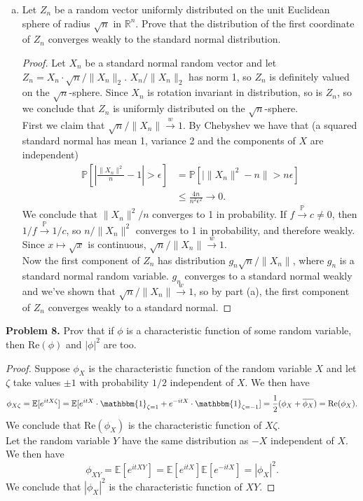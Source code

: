 \documentclass[11pt,letterpaper]{report}
\newcommand{\reals}{\mathbb{R}}
\newcommand{\E}{\mathbb{E}}
\newcommand{\Prob}{\mathbb{P}}
\newcommand{\ind}{\mathbbm{1}}
\newcommand{\inprob}{\xrightarrow{\Prob}}
\newcommand{\weakly}{\xrightarrow{w}}
\renewcommand{\Re}{\text{Re}}
\begin{document}
\begin{enumerate}[(a)]
	\item Let $Z_n$ be a random vector uniformly distributed on the unit Euclidean sphere of radius $\sqrt{n}$ in $\reals^n$. Prove that the distribution of the first coordinate of $Z_n$ converges weakly to the standard normal distribution.
	\begin{proof}
		Let $X_n$ be a standard normal random vector and let $Z_n = X_n\cdot \sqrt{n}/\|X_n\|_2$. $X_n/\|X_n\|_2$ has norm 1, so $Z_n$ is definitely valued on the $\sqrt{n}$-sphere. Since $X_n$ is rotation invariant in distribution, so is $Z_n$, so we conclude that $Z_n$ is uniformly distributed on the $\sqrt{n}$-sphere.\\

		\noindent First we claim that $\sqrt{n}/\|X_n\| \weakly 1$. By Chebyshev we have that (a squared standard normal has mean 1, variance 2 and the components of $X$ are independent)
		\begin{align*}
			\Prob\left[\left|\frac{\|X_n\|^2}{n} - 1\right| > \epsilon\right] &= \Prob[|\|X_n\|^2 - n\| > n\epsilon]\\
			&\leq \frac{4n}{n^2\epsilon^2}\to 0.
		\end{align*}
		We conclude that $\|X_n\|^2/n$ converges to 1 in probability. If $f\inprob c\neq 0$, then $1/f \inprob 1/c$, so $n/\|X_n\|^2$ converges to 1 in probability, and therefore weakly. Since $x\mapsto \sqrt{x}$ is continuous, $\sqrt{n}/\|X_n\| \weakly 1$.\\

		\noindent Now the first component of $Z_n$ has distribution $g_n \sqrt{n}/\|X_n\|$, where $g_n$ is a standard normal random variable. $g_n$ converges to a standard normal weakly and we've shown that $\sqrt{n}/\|X_n\|\weakly 1$, so by part (a), the first component of $Z_n$ converges weakly to a standard normal.
	\end{proof}
\end{enumerate}

\noindent\textbf{Problem 8. }
Prov that if $\phi$ is a characteristic function of some random variable, then $\Re(\phi)$ and $|\phi|^2$ are too.
\begin{proof}
	Suppose $\phi_X$ is the characteristic function of the random variable $X$ and let $\zeta$ take values $\pm 1$ with probability $1/2$ independent of $X$. We then have
	\begin{align*}
		\phi_{X\zeta} = \E[e^{itX\zeta}] = \E[e^{itX}\cdot \ind_{\zeta= 1} + e^{-itX}\cdot\ind_{\zeta = -1}] = \frac{1}{2}(\phi_X + \overline{\phi_X}) = \Re(\phi_X).
	\end{align*}
	We conclude that $\Re(\phi_X)$ is the characteristic function of $X\zeta$.\\

	\noindent Let the random variable $Y$ have the same distribution as $-X$ independent of $X$. We then have
	\[
	\phi_{XY} = \E[e^{itXY}] = \E[e^{itX}]\E[e^{-itX}] = |\phi_X|^2.
	\]
	We conclude that $|\phi_X|^2$ is the characteristic function of $XY$.
\end{proof}
\end{document}
